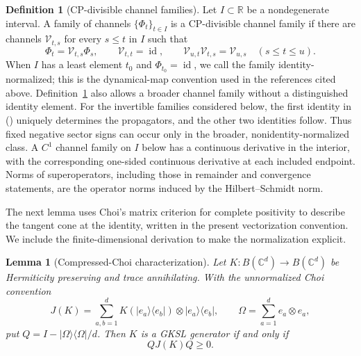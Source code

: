\documentclass[twoside,10pt]{article}
\numberwithin{equation}{section}
\theoremstyle{slbody}
\newtheorem{lemma}[theorem]{Lemma}
\theoremstyle{definition}
\newtheorem{definition}[theorem]{Definition}
\theoremstyle{remark}
\newcommand{\id}{\operatorname{id}}
\newcommand{\cV}{\mathcal V}
\renewcommand{\eqref}[1]{%
  \textup{{\normalfont(\oldstylenums{\ref{#1}}}\normalfont)}}
\begin{document}
\begin{definition}[CP-divisible channel families]\label{def:cp-divisibility}
Let \(I\subset\mathbb R\) be a nondegenerate interval.  A family of
channels \(\{\Phi_t\}_{t\in I}\) is a CP-divisible channel family if there
are channels
\(\cV_{t,s}\) for every \(s\leq t\) in \(I\) such that
\begin{equation}\label{eq:propagator-convention}
 \Phi_t=\cV_{t,s}\Phi_s,\qquad
 \cV_{t,t}=\id,\qquad
 \cV_{u,t}\cV_{t,s}=\cV_{u,s}\quad(s\leq t\leq u).
\end{equation}
When \(I\) has a least element \(t_0\) and \(\Phi_{t_0}=\id\), we call the
family identity-normalized; this is the dynamical-map convention used in
the references cited above.  Definition~\ref{def:cp-divisibility} also
allows a broader channel family without a distinguished identity element.
For the invertible families
considered below, the first identity in
\eqref{eq:propagator-convention} uniquely determines the propagators, and
the other two identities follow.  Thus fixed negative sector signs can
occur only in the broader, nonidentity-normalized class.
A \(C^1\) channel family on \(I\) below has a continuous derivative in the
interior, with the corresponding one-sided continuous derivative at
each included endpoint.  Norms of superoperators, including those in
remainder and convergence statements, are the operator norms induced
by the Hilbert--Schmidt norm.
\end{definition}

The next lemma uses Choi's matrix criterion for complete positivity
\cite[Theorem~2]{Choi1975} to describe the tangent cone at the identity,
written in the present vectorization convention.  We include the
finite-dimensional derivation to make the normalization explicit.

\begin{lemma}[Compressed-Choi characterization]
\label{lem:compressed-choi-gks}
Let \(K:B(\mathbb C^d)\to B(\mathbb C^d)\) be Hermiticity preserving
and trace annihilating.  With the unnormalized Choi convention
\begin{equation}\label{eq:compressed-choi-convention}
 J(K)=\sum_{a,b=1}^dK(|e_a\rangle\langle e_b|)
       \otimes|e_a\rangle\langle e_b|,
 \qquad
 \Omega=\sum_{a=1}^de_a\otimes e_a,
\end{equation}
put \(Q=I-|\Omega\rangle\langle\Omega|/d\).  Then \(K\) is a GKSL
generator if and only if
\begin{equation}\label{eq:compressed-choi-condition}
 QJ(K)Q\geq0.
\end{equation}
\end{lemma}
\end{document}
